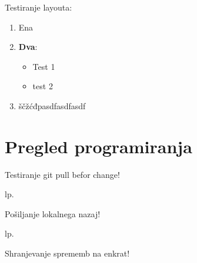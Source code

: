 
Testiranje layouta:

\begin{enumerate}
\item Ena
\item \textbf{Dva}:
  \begin{itemize}[style]
  \item Test 1
  \item test 2
  \end{itemize}
\item ščžćđpasdfasdfasdf
\end{enumerate}

\chapter{Pregled programiranja}
\label{chap:Pregled_programiranja}

Testiranje git pull befor change!

lp.

Pošiljanje lokalnega nazaj!

lp.

Shranjevanje sprememb na enkrat!



